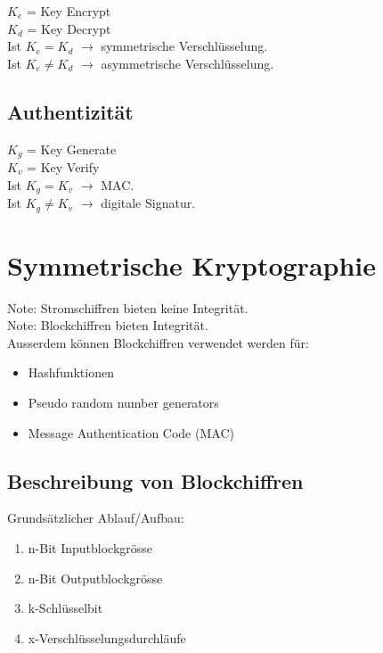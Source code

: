 \documentclass[12pt]{scrartcl}
\begin{document}
$K_e$ = Key Encrypt \\
$K_d$ = Key Decrypt \\


Ist $K_e = K_d$ $\rightarrow$ symmetrische Verschlüsselung.\\
Ist $K_e \neq K_d$ $\rightarrow$ asymmetrische Verschlüsselung.


\subsection{Authentizität}

$K_g$ = Key Generate \\
$K_v$ = Key Verify \\

Ist $K_g = K_v$ $\rightarrow$ MAC.\\
Ist $K_g \neq K_v$ $\rightarrow$ digitale Signatur.


\newpage
\label{sec:symmetrische_kryptographie}
\section{Symmetrische Kryptographie}

Note: Stromschiffren bieten keine Integrität.\\
Note: Blockchiffren bieten Integrität.\\
Ausserdem können Blockchiffren verwendet werden für:
\begin{itemize}
    \item Hashfunktionen
    \item Pseudo random number generators
    \item Message Authentication Code (MAC)
\end{itemize}


\subsection[Blockschiffren]{Beschreibung von Blockchiffren}

Grundsätzlicher Ablauf/Aufbau:

\begin{enumerate}
    \item n-Bit Inputblockgrösse
    \item n-Bit Outputblockgrösse
    \item k-Schlüsselbit
    \item x-Verschlüsselungsdurchläufe
\end{enumerate}
\end{document}

